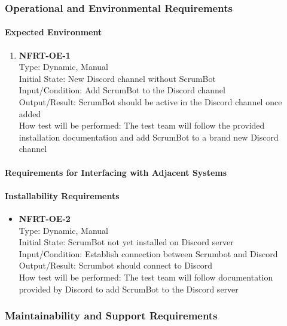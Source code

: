 \documentclass[12pt, titlepage]{article}
\begin{document}
\subsubsection{Operational and Environmental Requirements}
\paragraph{Expected Environment}
\begin{enumerate}
    \item{\textbf{NFRT-OE-1}}\\
    Type: Dynamic, Manual\\
    Initial State: New Discord channel without ScrumBot\\
    Input/Condition: Add ScrumBot to the Discord channel\\
    Output/Result: ScrumBot should be active in the Discord channel once added\\
    How test will be performed: The test team will follow the provided installation documentation and add ScrumBot to a brand new Discord channel
\end{enumerate}

\paragraph{Requirements for Interfacing with Adjacent Systems}


\paragraph{Installability Requirements}
\begin{itemize}
    \item{\textbf{NFRT-OE-2}}\\
    Type: Dynamic, Manual\\
    Initial State: ScrumBot not yet installed on Discord server\\
    Input/Condition: Establish connection between Scrumbot and Discord\\
    Output/Result: Scrumbot should connect to Discord\\
    How test will be performed: The test team will follow documentation provided by Discord to add ScrumBot to the Discord server
\end{itemize}

\subsubsection{Maintainability and Support Requirements}
\end{document}
